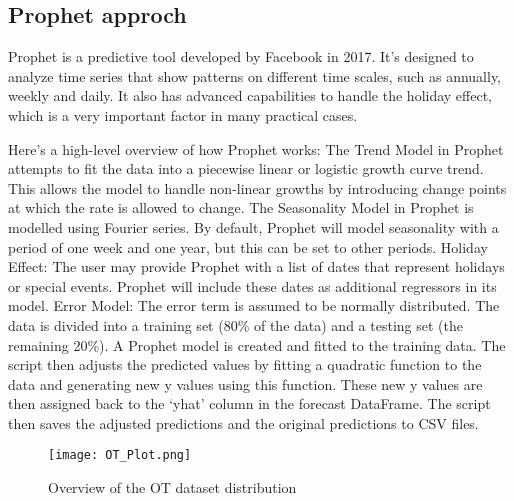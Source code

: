 \documentclass[10pt]{article}
\begin{document}
\begin{multicols}{2}
\subsection{Prophet approch}
Prophet is a predictive tool developed by Facebook in 2017. It's designed to analyze time series that show patterns on different time scales, such as annually, weekly and daily.
\newline It also has advanced capabilities to handle the holiday effect, which is a very important factor in many practical cases. \cite{c2}

Here’s a high-level overview of how Prophet works:
The Trend Model in Prophet attempts to fit the data into a piecewise linear or logistic growth curve trend. This allows the model to handle non-linear growths by introducing change points at which the rate is allowed to change.\newline
The Seasonality Model in Prophet is modelled using Fourier series. By default, Prophet will model seasonality with a period of one week and one year, but this can be set to other periods.\newline
Holiday Effect: The user may provide Prophet with a list of dates that represent holidays or special events. Prophet will include these dates as additional regressors in its model.
\newline Error Model: The error term is assumed to be normally distributed.
The data is divided into a training set (80\% of the data) and a testing set (the remaining 20\%).\newline
A Prophet model is created and fitted to the training data. The script then adjusts the predicted values by fitting a quadratic function to the data and generating new y values using this function. These new y values are then assigned back to the ‘yhat’ column in the forecast DataFrame.
The script then saves the adjusted predictions and the original predictions to CSV files.
\end{multicols}


\begin{figure}[h]
\centering
\texttt{[image: OT\_Plot.png]}
\caption{Overview of the OT dataset distribution}
\label{f1}
\end{figure}
\end{document}
